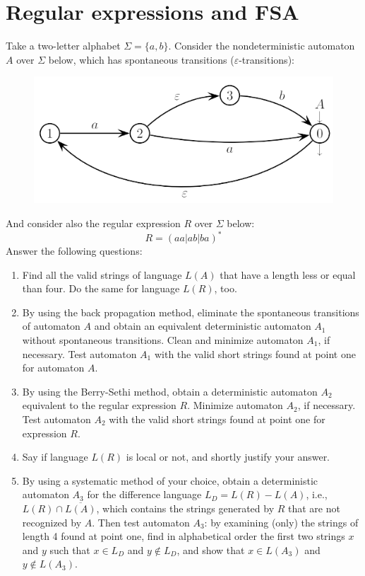 \documentclass[12pt, a4paper]{report}
\newtheorem[style=M, bodystyle=\normalfont]{theorem}{Theorem}
\newtheorem[style=M, bodystyle=\normalfont]{corollary}{Corollary}
\newtheorem[style=M, bodystyle=\normalfont]{lemma}{Lemma}
\newtheorem[style=M, bodystyle=\normalfont]{definition}{Definition}
\begin{document}
    \section{Regular expressions and FSA}
        Take a two-letter alphabet $\Sigma=\{a,b\}$.  Consider the nondeterministic automaton $A$ over $\Sigma$ below, which has spontaneous transitions ($\varepsilon$-transitions): 
        \begin{figure}[H]
            \centering
            \includegraphics[width=0.5\linewidth]{images/FSA1a.png}
        \end{figure}
        And consider also the regular expression $R$ over $\Sigma$ below:
        \[R=\left( aa|ab|ba \right)^{*}\]
        Answer the following questions:
        \begin{enumerate}
            \item Find all the valid strings of language $L(A)$ that have a length less or equal than four. Do the same for language $L(R)$, too.
            \item By using the back propagation method, eliminate the spontaneous transitions of automaton $A$ and obtain an equivalent deterministic automaton $A_1$ without spontaneous transitions. 
                Clean and minimize automaton $A_1$, if necessary. Test automaton $A_1$ with the valid short strings found at point one for automaton $A$. 
            \item By using the Berry-Sethi method, obtain a deterministic automaton $A_2$ equivalent to the regular expression $R$. Minimize automaton $A_2$, if necessary. Test automaton $A_2$ with the valid short 
                strings found at point one for expression $R$.
            \item Say if language $L(R)$ is local or not, and shortly justify your answer.
            \item By using a systematic method of your choice, obtain a deterministic automaton $A_3$ for the difference language $L_D=L(R)-L(A)$, i.e., $L(R) \cap \overline{L(A)}$, which contains the strings generated 
                by $R$ that are not recognized by $A$. Then test automaton $A_3$: by examining (only) the strings of length 4 found at point one, find in alphabetical order the first two strings $x$ and $y$ such that
                $x \in L_D$ and $y \notin L_D$, and show that $x \in L(A_3)$ and $y \notin L(A_3)$.
        \end{enumerate}
\end{document}
